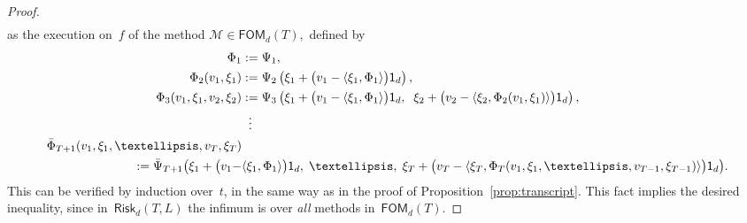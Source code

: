 \documentclass[10pt,a4paper]{amsart}
\newcommand{\FOM}{\textsf{FOM}}
\newcommand{\Mtd}{\mathscr{M}}
\newcommand{\Risk}{\mathsf{Risk}}
\newcommand{\bnabla}{\nabla}
\newcommand{\ones}{\mathsf{1}_d}
\begin{document}
\begin{proof}
\[\begin{aligned}
\end{aligned}
\]
\fi
as the execution on~$f$ of the method
$
\Mtd \in \FOM_d(T),
$
defined by
\newcommand{\bg}{\xi}
\[
\begin{aligned}
\Phi_1 &:= \Psi_1, \\
\Phi_2(v_1, \bg_1) 
&:= \Psi_2 \left(\bg_1 + \big(v_1 -\langle \bg_1,  \Phi_1 \rangle \big) \ones \right), \\
\Phi_3(v_1,\bg_1, v_2, \bg_2) 
&:= \Psi_3 
		\left(
			\bg_1 + \big(v_1 -\langle \bg_1,  \Phi_1 \rangle \big) \ones,  \;\;
			\bg_2 + \big(v_2 -\langle \bg_2,  \Phi_2(v_1,\bg_1) \rangle \big) \ones
		\right), \\
&\;\;\vdots \vspace{-0.1cm} \\ \vspace{-0.1cm}
\bar\Phi_{T+1}(v_1,\bg_1, \dots, v_T, \bg_T) \\
:= \bar\Psi_{T+1} 
		\big(
		\bg_1 + \big(v_1 - &\langle \bg_1, \Phi_1 \rangle \big) \ones, \;\dots,\;
		\bg_T + \big(v_T -\langle \bg_T,  \Phi_T(v_1,\bg_1, \dots, v_{T-1},\bg_{T-1}) \rangle \big) \ones
		\big).
\end{aligned}
\]
This can be verified by induction over~$t$, in the same way as in the proof of Proposition~\ref{prop:transcript}.
This fact implies the desired inequality, since in~$\Risk_{d}(T,L)$ the infimum is over {\em all} methods in~$\FOM_d(T)$. 
\end{proof}
\end{document}
